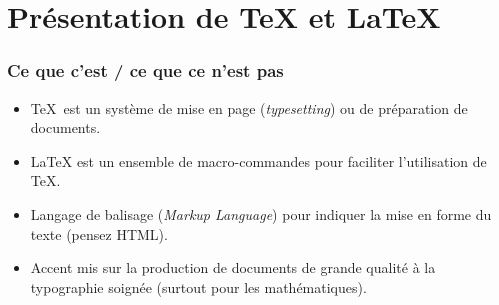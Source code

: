 \section{Présentation de {\TeX} et \LaTeX}


\begin{frame}[c]

	\frametitle{Ce que c'est / ce que ce n'est pas}
		
			\begin{itemize}
				
				\item \TeX\ est un système de mise en	page (\emph{typesetting}) ou de
				préparation de documents.
				
				\item {\LaTeX} est un ensemble de macro-commandes pour faciliter l’utilisation de \TeX.
				
				\item Langage de balisage (\emph{Markup Language}) pour indiquer la	mise en forme
					du texte (pensez HTML).
					
				\item Accent mis sur la production de documents de grande qualité à la typographie
					soignée (surtout pour les mathématiques).
			\end{itemize}

\end{frame}


